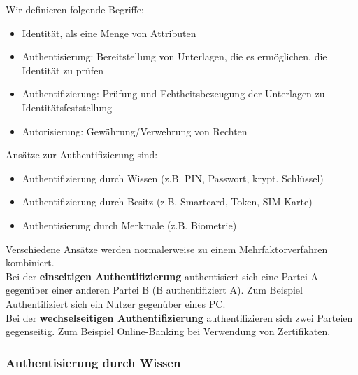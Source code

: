 \documentclass[a4paper,12pt,leqno]{article}
\begin{document}
Wir definieren folgende Begriffe:
\begin{itemize}
\item Identität, als eine Menge von Attributen
\item Authentisierung: Bereitstellung von Unterlagen, die es ermöglichen, die Identität zu prüfen
\item Authentifizierung: Prüfung und Echtheitsbezeugung der Unterlagen zu Identitätsfeststellung
\item Autorisierung: Gewährung/Verwehrung von Rechten 
\end{itemize}

Ansätze zur Authentifizierung sind:
\begin{itemize}
\item Authentifizierung durch Wissen (z.B. PIN, Passwort, krypt. Schlüssel)
\item Authentifizierung durch Besitz (z.B. Smartcard, Token, SIM-Karte)
\item Authentisierung durch Merkmale (z.B. Biometrie)
\end{itemize}
Verschiedene Ansätze werden normalerweise zu einem Mehrfaktorverfahren kombiniert.\\
Bei der \textbf{einseitigen Authentifizierung} authentisiert sich eine Partei A gegenüber einer anderen Partei B (B authentifiziert A). Zum Beispiel Authentifiziert sich ein Nutzer gegenüber eines PC.\\
Bei der \textbf{wechselseitigen Authentifizierung} authentifizieren sich zwei Parteien gegenseitig. Zum Beispiel Online-Banking bei Verwendung von Zertifikaten.

\subsubsection{Authentisierung durch Wissen}
\end{document}
